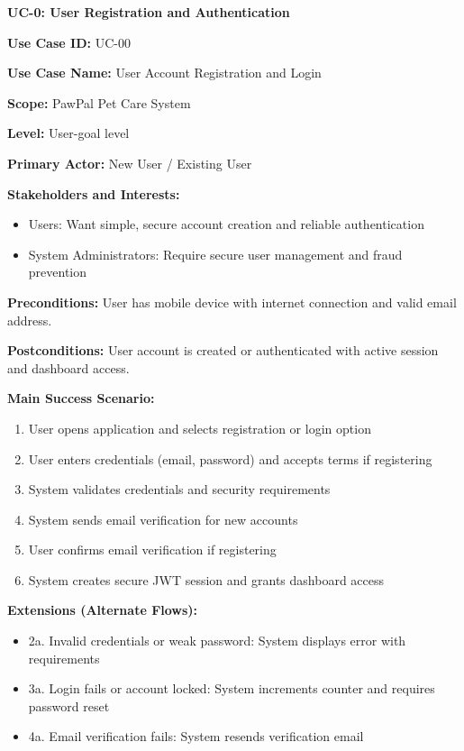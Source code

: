 \textbf{UC-0: User Registration and Authentication}

\textbf{Use Case ID:} UC-00

\textbf{Use Case Name:} User Account Registration and Login

\textbf{Scope:} PawPal Pet Care System

\textbf{Level:} User-goal level

\textbf{Primary Actor:} New User / Existing User

\textbf{Stakeholders and Interests:}
\begin{itemize}
    \item Users: Want simple, secure account creation and reliable authentication
    \item System Administrators: Require secure user management and fraud prevention
\end{itemize}

\textbf{Preconditions:} User has mobile device with internet connection and valid email address.

\textbf{Postconditions:} User account is created or authenticated with active session and dashboard access.

\textbf{Main Success Scenario:}
\begin{enumerate}
    \item User opens application and selects registration or login option
    \item User enters credentials (email, password) and accepts terms if registering
    \item System validates credentials and security requirements
    \item System sends email verification for new accounts
    \item User confirms email verification if registering
    \item System creates secure JWT session and grants dashboard access
\end{enumerate}

\textbf{Extensions (Alternate Flows):}
\begin{itemize}
    \item 2a. Invalid credentials or weak password: System displays error with requirements
    \item 3a. Login fails or account locked: System increments counter and requires password reset
    \item 4a. Email verification fails: System resends verification email
\end{itemize}

